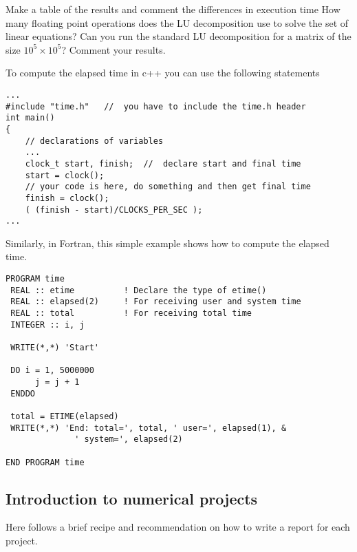 \documentclass[%
oneside,                 %
final,                   %
10pt]{article}
\begin{document}
Make a table of the results and comment the differences
in execution time
How many floating point operations does the LU decomposition use to solve the set of linear equations?
Can you run the standard LU decomposition
for a matrix of the size $10^5\times 10^5$?
Comment your results.


To compute the elapsed time in c++ you can use the following statements
\begin{verbatim}
...
#include "time.h"   //  you have to include the time.h header
int main()
{
    // declarations of variables 
    ...
    clock_t start, finish;  //  declare start and final time
    start = clock();
    // your code is here, do something and then get final time
    finish = clock();
    ( (finish - start)/CLOCKS_PER_SEC );
...
\end{verbatim}
Similarly, in Fortran, this simple example shows how to compute the elapsed time.
\begin{verbatim}
PROGRAM time
 REAL :: etime          ! Declare the type of etime()
 REAL :: elapsed(2)     ! For receiving user and system time
 REAL :: total          ! For receiving total time
 INTEGER :: i, j

 WRITE(*,*) 'Start'

 DO i = 1, 5000000  
      j = j + 1
 ENDDO

 total = ETIME(elapsed)
 WRITE(*,*) 'End: total=', total, ' user=', elapsed(1), &
              ' system=', elapsed(2)

END PROGRAM time
\end{verbatim}






\subsection*{Introduction to numerical projects}

Here follows a brief recipe and recommendation on how to write a report for each
project.
\end{document}
